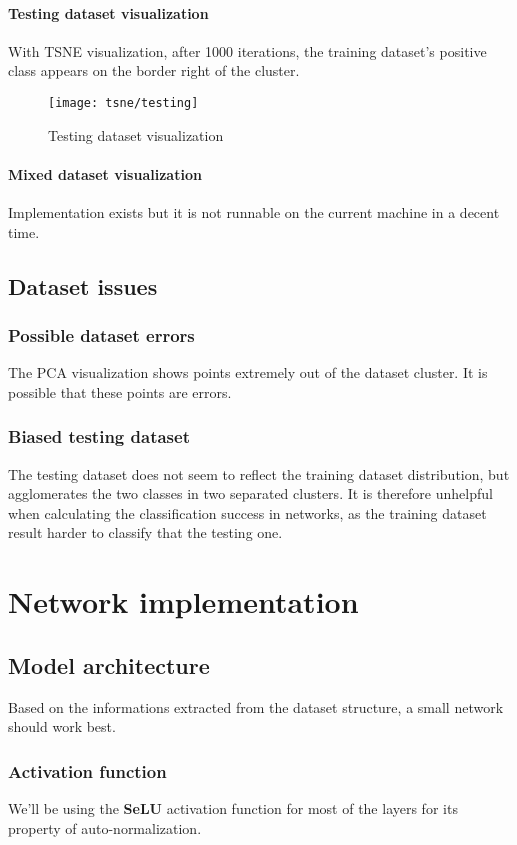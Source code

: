 \subsection{Testing dataset visualization}
With TSNE visualization, after 1000 iterations, the training dataset's positive class appears on the border right of the cluster.

\begin{figure}
	\texttt{[image: tsne/testing]}
	\caption{Testing dataset visualization}
\end{figure}

\subsection{Mixed dataset visualization}
Implementation exists but it is not runnable on the current machine in a decent time.

\chapter{Dataset issues}

\section{Possible dataset errors}
The PCA visualization shows points extremely out of the dataset cluster. It is possible that these points are errors.

\section{Biased testing dataset}
The testing dataset does not seem to reflect the training dataset distribution, but agglomerates the two classes in two separated clusters. It is therefore unhelpful when calculating the classification success in networks, as the training dataset result harder to classify that the testing one.

\part{Network implementation}
\chapter{Model architecture}
Based on the informations extracted from the dataset structure, a small network should work best.

\section{Activation function}
We'll be using the \textbf{SeLU} activation function for most of the layers for its property of auto-normalization.


